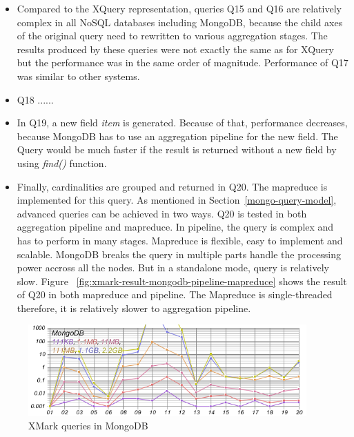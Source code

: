 \begin{itemize}
\item Compared to the XQuery representation, queries Q15 and Q16 are relatively complex in all NoSQL databases including MongoDB, because the child axes of the original query need to rewritten to various aggregation stages. The results produced by these queries were not exactly the same as for XQuery but the performance was in the same order of magnitude. Performance of Q17 was similar to other systems.

\item Q18 ...... 

\item In Q19, a new field \textit{item} is generated. Because of that, performance decreases, because  MongoDB has to use an aggregation pipeline for the new field. The Query would be much faster if the result is returned without a new field by using \textit{find()} function.

\item Finally, cardinalities are grouped and returned in Q20. The mapreduce is implemented for this query. As mentioned in Section~\ref{mongo-query-model}, advanced queries can be achieved in two ways. Q20 is tested in both aggregation pipeline and mapreduce. In pipeline, the query is complex and has to perform in many stages. Mapreduce is flexible, easy to implement and scalable. MongoDB breaks the query in multiple parts handle the processing power accross all the nodes. But in a standalone mode, query is relatively slow. Figure ~\ref{fig:xmark-result-mongodb-pipeline-mapreduce} shows the result of Q20 in both mapreduce and pipeline. The Mapreduce is single-threaded therefore, it is relatively slower to aggregation pipeline.
\end{itemize}
\begin{figure}
	\centering
	\includegraphics[width=0.95\textwidth]{img/result/mongodb/mongodb-all}
	\caption{XMark queries in MongoDB}
	\label{fig:xmark-result-mongodb-all}
	
\end{figure}	
